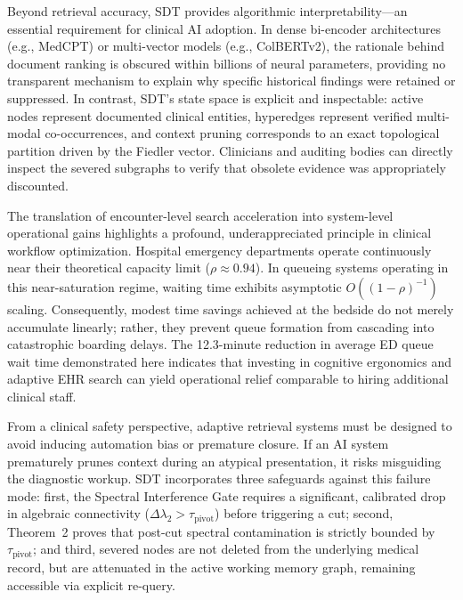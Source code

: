 \documentclass[12pt]{article}
\begin{document}
Beyond retrieval accuracy, SDT provides algorithmic interpretability—an essential requirement for clinical AI adoption\cite{topol2019high,ghassemi2021false}. In dense bi-encoder architectures (e.g., MedCPT) or multi-vector models (e.g., ColBERTv2), the rationale behind document ranking is obscured within billions of neural parameters, providing no transparent mechanism to explain why specific historical findings were retained or suppressed. In contrast, SDT's state space is explicit and inspectable: active nodes represent documented clinical entities, hyperedges represent verified multi-modal co-occurrences, and context pruning corresponds to an exact topological partition driven by the Fiedler vector. Clinicians and auditing bodies can directly inspect the severed subgraphs to verify that obsolete evidence was appropriately discounted.

The translation of encounter-level search acceleration into system-level operational gains highlights a profound, underappreciated principle in clinical workflow optimization. Hospital emergency departments operate continuously near their theoretical capacity limit ($\rho \approx 0.94$). In queueing systems operating in this near-saturation regime, waiting time exhibits asymptotic $O((1-\rho)^{-1})$ scaling\cite{erlang1917solution,kleinrock1975queueing}. Consequently, modest time savings achieved at the bedside do not merely accumulate linearly; rather, they prevent queue formation from cascading into catastrophic boarding delays. The 12.3-minute reduction in average ED queue wait time demonstrated here indicates that investing in cognitive ergonomics and adaptive EHR search can yield operational relief comparable to hiring additional clinical staff.

From a clinical safety perspective, adaptive retrieval systems must be designed to avoid inducing automation bias or premature closure\cite{goddard2012automation,croskerry2002achieving}. If an AI system prematurely prunes context during an atypical presentation, it risks misguiding the diagnostic workup. SDT incorporates three safeguards against this failure mode: first, the Spectral Interference Gate requires a significant, calibrated drop in algebraic connectivity ($\Delta \lambda_2 > \tau_{\text{pivot}}$) before triggering a cut; second, Theorem~2 proves that post-cut spectral contamination is strictly bounded by $\tau_{\text{pivot}}$; and third, severed nodes are not deleted from the underlying medical record, but are attenuated in the active working memory graph, remaining accessible via explicit re-query.
\end{document}

